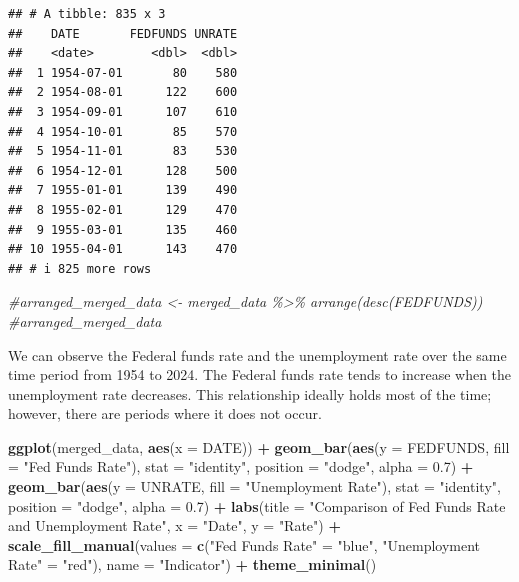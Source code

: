 \documentclass[
]{article}
\newenvironment{Shaded}{\begin{snugshade}}{\end{snugshade}}
\newcommand{\AttributeTok}[1]{\textcolor[rgb]{0.13,0.29,0.53}{#1}}
\newcommand{\CommentTok}[1]{\textcolor[rgb]{0.56,0.35,0.01}{\textit{#1}}}
\newcommand{\FloatTok}[1]{\textcolor[rgb]{0.00,0.00,0.81}{#1}}
\newcommand{\FunctionTok}[1]{\textcolor[rgb]{0.13,0.29,0.53}{\textbf{#1}}}
\newcommand{\NormalTok}[1]{#1}
\newcommand{\OtherTok}[1]{\textcolor[rgb]{0.56,0.35,0.01}{#1}}
\newcommand{\SpecialCharTok}[1]{\textcolor[rgb]{0.81,0.36,0.00}{\textbf{#1}}}
\newcommand{\StringTok}[1]{\textcolor[rgb]{0.31,0.60,0.02}{#1}}
\begin{document}
\begin{verbatim}
## # A tibble: 835 x 3
##    DATE       FEDFUNDS UNRATE
##    <date>        <dbl>  <dbl>
##  1 1954-07-01       80    580
##  2 1954-08-01      122    600
##  3 1954-09-01      107    610
##  4 1954-10-01       85    570
##  5 1954-11-01       83    530
##  6 1954-12-01      128    500
##  7 1955-01-01      139    490
##  8 1955-02-01      129    470
##  9 1955-03-01      135    460
## 10 1955-04-01      143    470
## # i 825 more rows
\end{verbatim}

\begin{Shaded}
\begin{Highlighting}[]
\CommentTok{\#arranged\_merged\_data \textless{}{-} merged\_data \%\textgreater{}\% arrange(desc(FEDFUNDS))}
\CommentTok{\#arranged\_merged\_data}
\end{Highlighting}
\end{Shaded}

We can observe the Federal funds rate and the unemployment rate over the
same time period from 1954 to 2024. The Federal funds rate tends to
increase when the unemployment rate decreases. This relationship ideally
holds most of the time; however, there are periods where it does not
occur.

\begin{Shaded}
\begin{Highlighting}[]
\FunctionTok{ggplot}\NormalTok{(merged\_data, }\FunctionTok{aes}\NormalTok{(}\AttributeTok{x =}\NormalTok{ DATE)) }\SpecialCharTok{+}
  \FunctionTok{geom\_bar}\NormalTok{(}\FunctionTok{aes}\NormalTok{(}\AttributeTok{y =}\NormalTok{ FEDFUNDS, }\AttributeTok{fill =} \StringTok{"Fed Funds Rate"}\NormalTok{), }\AttributeTok{stat =} \StringTok{"identity"}\NormalTok{, }\AttributeTok{position =} \StringTok{"dodge"}\NormalTok{, }\AttributeTok{alpha =} \FloatTok{0.7}\NormalTok{) }\SpecialCharTok{+}
  \FunctionTok{geom\_bar}\NormalTok{(}\FunctionTok{aes}\NormalTok{(}\AttributeTok{y =}\NormalTok{ UNRATE, }\AttributeTok{fill =} \StringTok{"Unemployment Rate"}\NormalTok{), }\AttributeTok{stat =} \StringTok{"identity"}\NormalTok{, }\AttributeTok{position =} \StringTok{"dodge"}\NormalTok{, }\AttributeTok{alpha =} \FloatTok{0.7}\NormalTok{) }\SpecialCharTok{+}
  \FunctionTok{labs}\NormalTok{(}\AttributeTok{title =} \StringTok{"Comparison of Fed Funds Rate and Unemployment Rate"}\NormalTok{,}
       \AttributeTok{x =} \StringTok{"Date"}\NormalTok{,}
       \AttributeTok{y =} \StringTok{"Rate"}\NormalTok{) }\SpecialCharTok{+}
  \FunctionTok{scale\_fill\_manual}\NormalTok{(}\AttributeTok{values =} \FunctionTok{c}\NormalTok{(}\StringTok{"Fed Funds Rate"} \OtherTok{=} \StringTok{"blue"}\NormalTok{, }\StringTok{"Unemployment Rate"} \OtherTok{=} \StringTok{"red"}\NormalTok{),}
                    \AttributeTok{name =} \StringTok{"Indicator"}\NormalTok{) }\SpecialCharTok{+}
  \FunctionTok{theme\_minimal}\NormalTok{()}
\end{Highlighting}
\end{Shaded}
\end{document}
